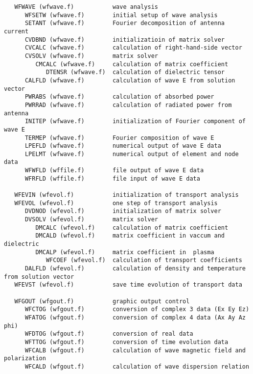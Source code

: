 \begin{verbatim}
   WFWAVE (wfwave.f)           wave analysis
      WFSETW (wfwave.f)        initial setup of wave analysis
      SETANT (wfwave.f)        Fourier decomposition of antenna current
      CVDBND (wfwave.f)        initializatioin of matrix solver
      CVCALC (wfwave.f)        calculation of right-hand-side vector
      CVSOLV (wfwave.f)        matrix solver
         CMCALC (wfwave.f)     calculation of matrix coefficient
            DTENSR (wfwave.f)  calculation of dielectric tensor
      CALFLD (wfwave.f)        calculation of wave E from solution vector
      PWRABS (wfwave.f)        calculation of absorbed power
      PWRRAD (wfwave.f)        calculation of radiated power from antenna
      INITEP (wfwave.f)        initialization of Fourier component of wave E
      TERMEP (wfwave.f)        Fourier composition of wave E
      LPEFLD (wfwave.f)        numerical output of wave E data
      LPELMT (wfwave.f)        numerical output of element and node data
      WFWFLD (wffile.f)        file output of wave E data
      WFRFLD (wffile.f)        file input of wave E data

   WFEVIN (wfevol.f)           initialization of transport analysis
   WFEVOL (wfevol.f)           one step of transport analysis
      DVDNOD (wfevol.f)        initialization of matrix solver
      DVSOLV (wfevol.f)        matrix solver
         DMCALC (wfevol.f)     calculation of matrix coefficient
         DMCALD (wfevol.f)     matrix coefficient in vaccum and dielectric
         DMCALP (wfevol.f)     matrix coefficient in  plasma
            WFCOEF (wfevol.f)  calculation of transport coefficients
      DALFLD (wfevol.f)        calculation of density and temperature from solution vector
   WFEVST (wfevol.f)           save time evolution of transport data

   WFGOUT (wfgout.f)           graphic output control
      WFCTOG (wfgout.f)        conversion of complex 3 data (Ex Ey Ez)
      WFATOG (wfgout.f)        conversion of complex 4 data (Ax Ay Az phi)
      WFDTOG (wfgout.f)        conversion of real data
      WFTTOG (wfgout.f)        conversion of time evolution data
      WFCALB (wfgout.f)        calculation of wave magnetic field and polarization
      WFCALD (wfgout.f)        calculation of wave dispersion relation


\end{verbatim}
